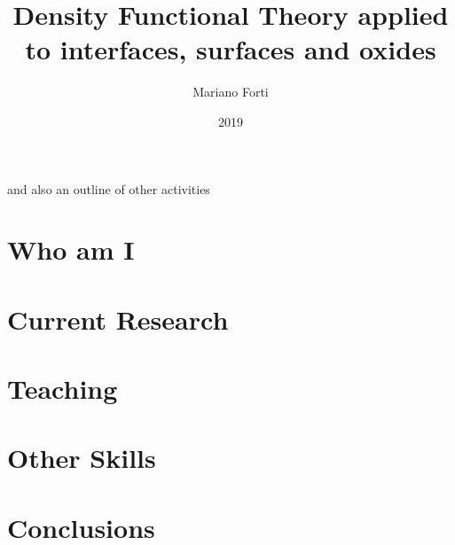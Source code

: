 \documentclass[xcolor={dvipsnames,x11names,svgnames},aspectratio=169]{beamer}
\title{Density Functional Theory applied to interfaces, surfaces and oxides }
\author{Mariano Forti}
\date{2019}
\begin{document}
\begin{frame}[plain]
\titlepage
\begin{center}
  and also an outline of other activities
\end{center}

\end{frame}


\section{Who am I}


\section{Current Research}





\section{Teaching}


\section{Other Skills}



\section{Conclusions}

\end{document}
